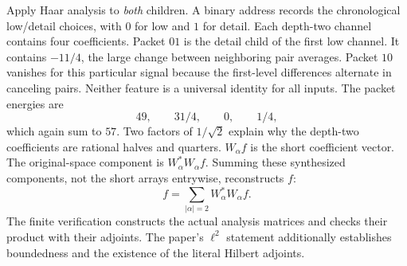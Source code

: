 Apply Haar analysis to \emph{both} children. A binary address records the chronological low/detail choices, with $0$ for low and $1$ for detail. Each depth-two channel contains four coefficients.
Packet $01$ is the detail child of the first low channel. It contains $-11/4$, the large change between neighboring pair averages. Packet $10$ vanishes for this particular signal because the first-level differences alternate in canceling pairs. Neither feature is a universal identity for all inputs.
The packet energies are
\[
49,\qquad 31/4,\qquad 0,\qquad 1/4,
\]
which again sum to $57$. Two factors of $1/\sqrt2$ explain why the depth-two coefficients are rational halves and quarters.
$W_\alpha f$ is the short coefficient vector. The original-space component is $W_\alpha^*W_\alpha f$. Summing these synthesized components, not the short arrays entrywise, reconstructs $f$:
\[
f=\sum_{|\alpha|=2}W_\alpha^*W_\alpha f.
\]
The finite verification constructs the actual analysis matrices and checks their product with their adjoints. The paper's $\ell^2$ statement additionally establishes boundedness and the existence of the literal Hilbert adjoints.

